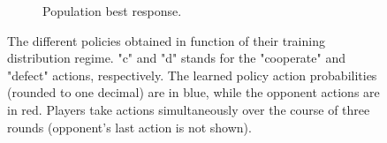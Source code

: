 \begin{figure}
\begin{subfigure}[t]{\linewidth}
\begin{tikzpicture}
\end{tikzpicture}
\caption{Population best response.}
\end{subfigure}
\caption{\label{fig:prisoners.binary_trees}
The different policies obtained in function of their training distribution regime. "c" and "d" stands for the "cooperate" and "defect" actions, respectively. The learned policy action probabilities (rounded to one decimal) are in blue, while the opponent actions are in red. Players take actions simultaneously over the course of three rounds (opponent's last action is not shown).}
\end{figure}
